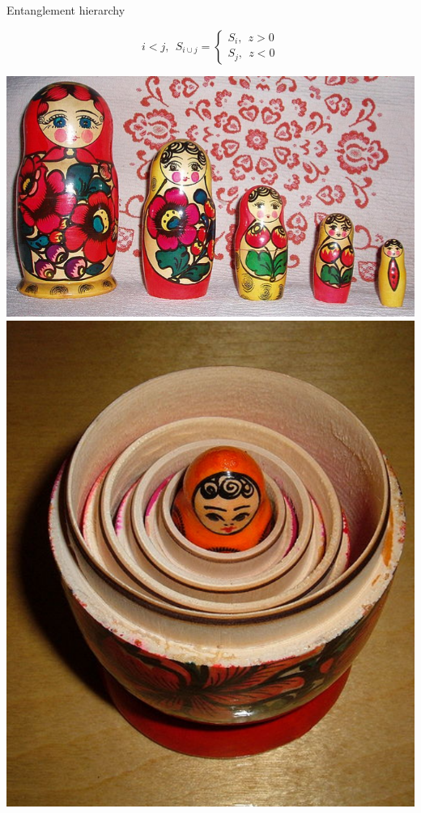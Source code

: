 \documentclass[11pt,aspectratio=169]{beamer}
\begin{document}
\begin{frame}{Entanglement hierarchy}
\begin{minipage}{0.5\textwidth}
\[i < j, ~ ~ S_{i\cup j} =
	\begin{cases}
	S_{i}, ~ ~ z > 0\\
	S_{j}, ~ ~ z < 0
	\end{cases}
\]
\end{minipage}
\begin{minipage}{0.45\textwidth}
\includegraphics[height=0.3\textheight]{figures/Matroshka.png}
\includegraphics[height=0.3\textheight]{figures/nested.png}
\end{minipage}


\end{frame}
\end{document}
